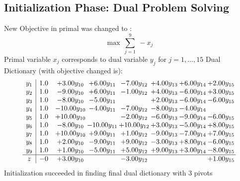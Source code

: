 \documentclass[9pt]{article}
\begin{document}
\subsection{Initialization Phase: Dual Problem Solving}
New Objective in primal was changed to : \[ \max\ \sum_{j=1}^{9}\ - x_j \] 
Primal variable $x_j$ corresponds to dual variable $y_j$ for $j = 1,\ldots,15$
Dual Dictionary (with objective changed is): 
\[\begin{array}{c| c c@{\hskip 2pt} c@{\hskip 2pt} c@{\hskip 2pt} c@{\hskip 2pt} c@{\hskip 2pt} c@{\hskip 2pt} }
 y_{1}   &  1.0 & +  3.00 y_{10} & +  6.00 y_{11} & -7.00 y_{12} & +  4.00 y_{13} & +  6.00 y_{14} & +  2.00 y_{15}\\
 y_{2}   &  1.0 & -9.00 y_{10} & +  6.00 y_{11} & -1.00 y_{12} & +  4.00 y_{13} & -6.00 y_{14} & +  3.00 y_{15}\\
 y_{3}   &  1.0 & -8.00 y_{10} & -5.00 y_{11} &   & +  2.00 y_{13} & -6.00 y_{14} & -6.00 y_{15}\\
 y_{4}   &  1.0 & -10.00 y_{10} & -4.00 y_{11} & -7.00 y_{12} & -8.00 y_{13} & -4.00 y_{14} &   \\
 y_{5}   &  1.0 & + 10.00 y_{10} &   & -2.00 y_{12} & -6.00 y_{13} & -9.00 y_{14} & -6.00 y_{15}\\
 y_{6}   &  1.0 & -8.00 y_{10} & -10.00 y_{11} & + 10.00 y_{12} & +  3.00 y_{13} & -5.00 y_{14} & +  8.00 y_{15}\\
 y_{7}   &  1.0 & + 10.00 y_{10} & +  9.00 y_{11} & +  1.00 y_{12} & -9.00 y_{13} & -7.00 y_{14} & +  7.00 y_{15}\\
 y_{8}   &  1.0 & +  2.00 y_{10} & -9.00 y_{11} & +  9.00 y_{12} & -3.00 y_{13} & +  8.00 y_{14} & -6.00 y_{15}\\
 y_{9}   &  1.0 & +  1.00 y_{10} & -5.00 y_{11} & +  5.00 y_{12} & +  9.00 y_{13} & +  3.00 y_{14} & -8.00 y_{15}\\
\hline
z    &  -0 & +  3.00 y_{10} &   & -3.00 y_{12} &    &   & +  1.00 y_{15}\\
\end{array}\]
Initialization succeeded in finding final dual dictionary with 3 pivots
\end{document}
